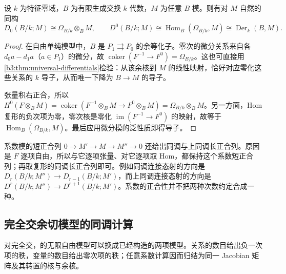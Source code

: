 \begin{proposition}\label{b3:prop:C-aq-degree-zero}
	设 \(k\) 为特征零域，\(B\) 为有限生成交换 \(k\) 代数，\(M\) 为任意 \(B\) 模。则有对 \(M\) 自然的同构
	\[
		D_0(B/k;M)\cong\Omega_{B/k}\otimes_BM,\qquad
		D^0(B/k;M)\cong\operatorname{Hom}_B(\Omega_{B/k},M)\cong\operatorname{Der}_k(B,M).
	\]
\end{proposition}
\begin{proof}
	在自由单纯模型中，\(B\) 是 \(P_1\rightrightarrows P_0\) 的余等化子。零次的微分关系来自各 \(d_0a-d_1a\)（\(a\in P_1\)）的微分，故 \(\operatorname{coker}(F^{-1}\to F^0)=\Omega_{B/k}\)。这也可直接用\cref{b3:thm:universal-differentials}检验：从该余核到 \(M\) 的线性映射，恰好对应零化这些关系的 \(k\) 导子，从而唯一下降为 \(B\to M\) 的导子。

	张量积右正合，所以 \(H^0(F\otimes_BM)=\operatorname{coker}(F^{-1}\otimes_BM\to F^0\otimes_BM)=\Omega_{B/k}\otimes_BM\)。另一方面，Hom 复形的负次项为零，零次核是零化 \(\operatorname{im}(F^{-1}\to F^0)\) 的映射，故等于 \(\operatorname{Hom}_B(\Omega_{B/k},M)\)。最后应用微分模的泛性质即得导子。
\end{proof}

系数模的短正合列 \(0\to M'\to M\to M''\to0\) 还给出同调与上同调长正合列。原因是 \(F\) 逐项自由，所以与它逐项张量、对它逐项取 Hom，都保持这个系数短正合列；再取复形的同调长正合列即可。例如同调连接态射的方向是 \(D_r(B/k;M'')\to D_{r-1}(B/k;M')\)，而上同调连接态射的方向是 \(D^r(B/k;M'')\to D^{r+1}(B/k;M')\)。系数的正合性并不把两种次数约定合成一种。

\subsection{完全交余切模型的同调计算}
\label{b3:subsec:C06:02}

对完全交，的无限自由模型可以换成已经构造的两项模型。关系的数目给出负一次项的秩，变量的数目给出零次项的秩；任意系数计算因而归结为同一 Jacobian 矩阵及其转置的核与余核。

